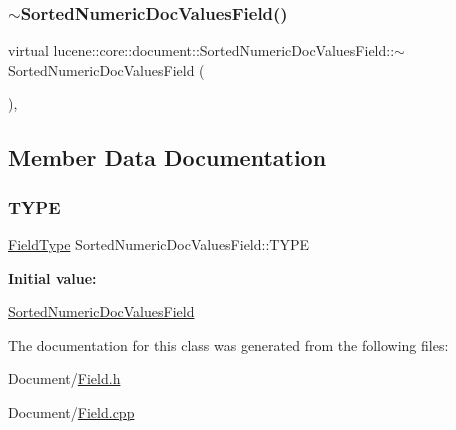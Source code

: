 \subsubsection{\texorpdfstring{$\sim$\+Sorted\+Numeric\+Doc\+Values\+Field()}{~SortedNumericDocValuesField()}}
{\footnotesize\ttfamily virtual lucene\+::core\+::document\+::\+Sorted\+Numeric\+Doc\+Values\+Field\+::$\sim$\+Sorted\+Numeric\+Doc\+Values\+Field (\begin{DoxyParamCaption}{ }\end{DoxyParamCaption})\hspace{0.3cm}{\ttfamily [inline]}, {\ttfamily [virtual]}}



\subsection{Member Data Documentation}
\mbox{\label{classlucene_1_1core_1_1document_1_1SortedNumericDocValuesField_a65165dc2b4de45408cccb373f92a1334}} 
\subsubsection{\texorpdfstring{T\+Y\+PE}{TYPE}}
{\footnotesize\ttfamily \mbox{\hyperlink{classlucene_1_1core_1_1document_1_1FieldType}{Field\+Type}} Sorted\+Numeric\+Doc\+Values\+Field\+::\+T\+Y\+PE\hspace{0.3cm}{\ttfamily [static]}}

{\bfseries Initial value\+:}
\begin{DoxyCode}
\DoxyCodeLine{= []() \{}
\DoxyCodeLine{\}()}
\end{DoxyCode}
\mbox{\hyperlink{classlucene_1_1core_1_1document_1_1SortedNumericDocValuesField}{Sorted\+Numeric\+Doc\+Values\+Field}} 

The documentation for this class was generated from the following files\+:\begin{DoxyCompactItemize}
\item 
Document/\mbox{\hyperlink{Document_2Field_8h}{Field.\+h}}\item 
Document/\mbox{\hyperlink{Field_8cpp}{Field.\+cpp}}\end{DoxyCompactItemize}
